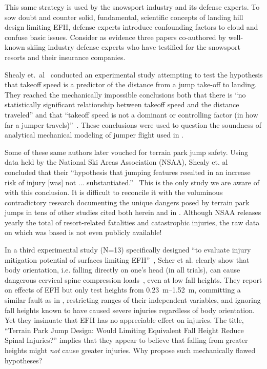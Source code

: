 \documentclass[smallextended]{svjour3}       %
\begin{document}
This same strategy is used by the snowsport industry and its defense experts.
To sow doubt and counter solid, fundamental, scientific concepts of landing
hill design limiting EFH, defense experts introduce confounding factors to
cloud and confuse basic issues.  Consider as evidence three papers
\cite{Shealy2010,Shealy2015,Scher2015} co-authored by well-known skiing
industry defense experts who have testified for the snowsport resorts and their
insurance companies.

Shealy et.~al~\cite{Shealy2010} conducted an experimental study attempting to
test the hypothesis that takeoff speed is a predictor of the distance from a
jump take-off to landing. They reached the mechanically impossible conclusions
both that there is ``no statistically significant relationship between takeoff
speed and the distance traveled'' and that ``takeoff speed is not a dominant or
controlling factor (in how far a jumper travels)''~\cite{Shealy2010}. These
conclusions were used to question the soundness of analytical mechanical
modeling of jumper flight used in \cite{Hubbard2009,McNeil2012}.

Some of these same authors later vouched for terrain park jump safety. Using
data held by the National Ski Areas Association (NSAA), Shealy et.
al~\cite{Shealy2015} concluded that their ``hypothesis that jumping features
resulted in an increase risk of injury [was] not ...
substantiated.''~\cite{Shealy2015} This is the only study we are aware of with
this conclusion. It is difficult to reconcile it with the voluminous
contradictory research documenting the unique dangers posed by terrain park
jumps in tens of other studies cited both herein and in
\cite{Hubbard2009,Swedberg2012,McNeil2012,McNeil2012a,Hubbard2015,Levy2015,Petrone2017,Moore2018}.
Although NSAA releases yearly the total of resort-related fatalities and
catastrophic injuries, the raw data on which \cite{Shealy2015} was based is not
even publicly available!

In a third experimental study (N=13) specifically designed ``to evaluate injury
mitigation potential of surfaces limiting EFH''~\cite{Scher2015}, Scher et al.
clearly show that body orientation, i.e. falling directly on one's head (in all
trials), can cause dangerous cervical spine compression loads~\cite{Scher2015},
even at low fall heights. They report on effects of EFH but only test heights
from \SIrange{0.23}{1.52}{\meter}, committing a similar fault as in
\cite{Shealy2010}, restricting ranges of their independent variables, and
ignoring fall heights known to have caused severe injuries regardless of body
orientation. Yet they insinuate that EFH has no appreciable effect on injuries.
The title, ``Terrain Park Jump Design: Would Limiting Equivalent Fall Height
Reduce Spinal Injuries?'' implies that they appear to believe that falling from
greater heights might \emph{not} cause greater injuries. Why propose such
mechanically flawed hypotheses?
\end{document}
